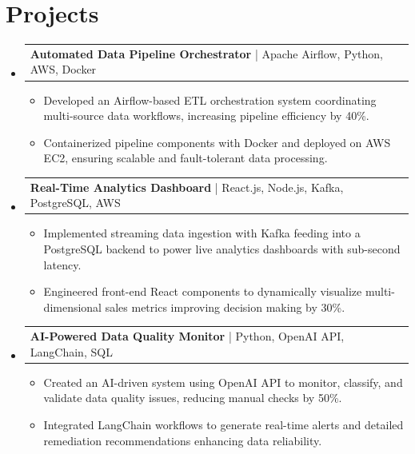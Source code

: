 \documentclass[letterpaper,11pt]{article}
\makeatletter
\newcommand{\resumeItem}[1]{
  \item\footnotesize{
    {#1 \vspace{-2pt}}
  }
}
\newcommand{\resumeProjectHeading}[2]{
    \item
    \begin{tabular*}{1.001\textwidth}{l@{\extracolsep{\fill}}r}
      \small#1 & \textbf{\small #2}\\
    \end{tabular*}\vspace{-7pt}
}
\newcommand{\resumeSubHeadingListStart}{\begin{itemize}[leftmargin=0pt, label={}]}
\newcommand{\resumeSubHeadingListEnd}{\end{itemize}}
\newcommand{\resumeItemListStart}{\begin{itemize}[leftmargin=*]}
\newcommand{\resumeItemListEnd}{\end{itemize}\vspace{-5pt}}
\makeatother
\begin{document}
\section{Projects}
    \vspace{-5pt}
    \resumeSubHeadingListStart
          \resumeProjectHeading
              {\textbf{Automated Data Pipeline Orchestrator} | Apache Airflow, Python, AWS, Docker}{}
        \resumeItemListStart
            \resumeItem{Developed an Airflow-based ETL orchestration system coordinating multi-source data workflows, increasing pipeline efficiency by 40\%.}
            \resumeItem{Containerized pipeline components with Docker and deployed on AWS EC2, ensuring scalable and fault-tolerant data processing.}
        \resumeItemListEnd
        \vspace{-12pt}
    
    \resumeProjectHeading
        {\textbf{Real-Time Analytics Dashboard} | React.js, Node.js, Kafka, PostgreSQL, AWS}{}
        \resumeItemListStart
            \resumeItem{Implemented streaming data ingestion with Kafka feeding into a PostgreSQL backend to power live analytics dashboards with sub-second latency.}
            \resumeItem{Engineered front-end React components to dynamically visualize multi-dimensional sales metrics improving decision making by 30\%.}
        \resumeItemListEnd
          \vspace{-12pt}
      \resumeProjectHeading
          {\textbf{AI-Powered Data Quality Monitor} | Python, OpenAI API, LangChain, SQL}{}
          \resumeItemListStart
              \resumeItem{Created an AI-driven system using OpenAI API to monitor, classify, and validate data quality issues, reducing manual checks by 50\%.}
              \resumeItem{Integrated LangChain workflows to generate real-time alerts and detailed remediation recommendations enhancing data reliability.}
          \resumeItemListEnd 
    \resumeSubHeadingListEnd
\end{document}
